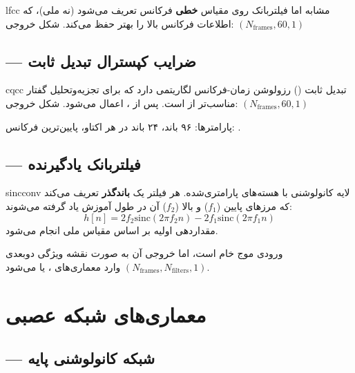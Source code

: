 \documentclass[12pt]{report}
\begin{document}
\begin{dfnbox}{}{lfcc}
    مشابه  اما فیلتربانک روی مقیاس \textbf{خطی} فرکانس تعریف می‌شود
    (نه ملی)، که اطلاعات فرکانس بالا را بهتر حفظ می‌کند.
    شکل خروجی: $(N_{\text{frames}}, 60, 1)$
\end{dfnbox}

\section{ — ضرایب کپسترال تبدیل  ثابت}

\begin{dfnbox}{}{cqcc}
    تبدیل  ثابت () رزولوشن زمان-فرکانس لگاریتمی دارد که برای
    تجزیه‌وتحلیل گفتار مناسب‌تر از  است. پس از ، 
    اعمال می‌شود.
    شکل خروجی: $(N_{\text{frames}}, 60, 1)$
\end{dfnbox}

پارامترها: ۹۶ باند، ۲۴ باند در هر اکتاو، پایین‌ترین فرکانس: .

\section{ — فیلتربانک یادگیرنده}

\begin{dfnbox}{}{sincconv}
    لایه کانولوشنی با هسته‌های  پارامتری‌شده. هر فیلتر یک
    \textbf{باندگذر} تعریف می‌کند که مرزهای پایین ($f_1$) و بالا ($f_2$)
    آن در طول آموزش یاد گرفته می‌شوند:
    \[
        h[n] = 2f_2 \text{sinc}(2\pi f_2 n) - 2f_1 \text{sinc}(2\pi f_1 n)
    \]
    مقداردهی اولیه بر اساس مقیاس ملی انجام می‌شود.
\end{dfnbox}

\begin{notebox}
    ورودی  موج خام است، اما خروجی آن به صورت نقشه ویژگی دوبعدی
    $(N_{\text{frames}}, N_{\text{filters}}, 1)$ وارد معماری‌های ،
     یا  می‌شود.
\end{notebox}

\chapter{معماری‌های شبکه عصبی}

\section{ — شبکه کانولوشنی پایه}
\end{document}

